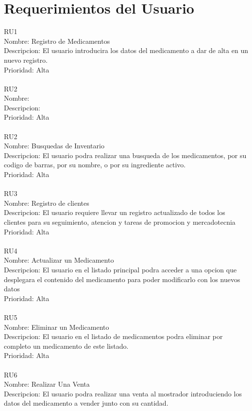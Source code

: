 \section{Requerimientos del Usuario}
RU1\\
Nombre: Registro de Medicamentos \\
Descripcion: El usuario introducira los datos del medicamento a dar de alta en un nuevo
registro.\\
Prioridad: Alta \\
\\
RU2\\
Nombre:  \\
Descripcion: \\
Prioridad: Alta \\
\\
RU2\\
Nombre: Busquedas de Inventario \\
Descripcion: El usuario podra realizar una busqueda de los medicamentos, por su codigo de
barras, por su nombre, o por su ingrediente activo.\\
Prioridad: Alta \\
\\
RU3\\
Nombre: Registro de clientes \\
Descripcion: El usuario requiere llevar un registro actualizado de todos los clientes para su seguimiento, atencion y tareas de promocion y mercadotecnia\\
Prioridad: Alta \\
\\
RU4\\
Nombre:  Actualizar un Medicamento\\
Descripcion: El usuario en el listado principal podra acceder a una opcion que desplegara el
contenido del medicamento para poder modificarlo con los nuevos datos\\
Prioridad: Alta \\
\\
RU5\\
Nombre:  Eliminar un  Medicamento\\
Descripcion: El usuario en el listado de medicamentos podra eliminar por completo un medicamento
de este listado.\\
Prioridad: Alta \\
\\
RU6\\
Nombre:  Realizar Una Venta\\
Descripcion: El usuario podra realizar una venta al mostrador introduciendo los datos del medicamento a vender junto con su cantidad.\\
